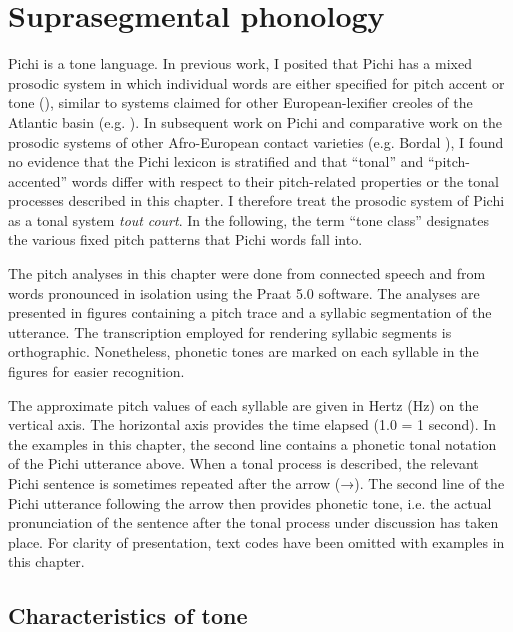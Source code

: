 \chapter{Suprasegmental phonology}

Pichi is a tone language. In previous work, I posited that Pichi has a mixed prosodic system in which individual words are either specified for pitch accent or tone (\citealt{Yakpo2009a,Yakpo2009b}), similar to systems claimed for other European-lexifier creoles of the Atlantic basin (e.g. \citealt{Rountree1972,Alleyne1980,Devonish1989,Devonish2002,Good2004,Castillo1998,CastilloFaraclas2006}). In subsequent work on Pichi and comparative work on the  prosodic systems of other Afro-European contact varieties (e.g. Bordal \citealt{SteienYakpo2017}), I found no evidence that the Pichi lexicon is stratified and that “tonal” and “pitch-accented” words differ with respect to their pitch-related properties or the tonal processes described in this chapter. I therefore treat the prosodic system of Pichi as a tonal system \textit{tout} \textit{court}. In the following, the term “tone class” designates the various fixed pitch patterns that Pichi words fall into. 


The pitch analyses in this chapter were done from connected speech and from words pronounced in isolation using the Praat 5.0 software. The analyses are presented in figures containing a pitch trace and a syllabic segmentation of the utterance. The transcription employed for rendering syllabic segments is orthographic. Nonetheless, phonetic tones are marked on each syllable in the figures for easier recognition.



The approximate pitch values of each syllable are given in Hertz (Hz) on the vertical axis. The horizontal axis provides the time elapsed (1.0 = 1 second). In  the examples in this chapter, the second line contains a phonetic tonal notation of the Pichi utterance above. When a tonal process is described, the relevant Pichi sentence is sometimes repeated after the arrow (→). The second line of the Pichi utterance following the arrow then provides phonetic tone, i.e. the actual pronunciation of the sentence after the tonal process under discussion has taken place. For clarity of presentation, text codes have been omitted with examples in this chapter.


\section{Characteristics of tone}\label{sec:3.1}

